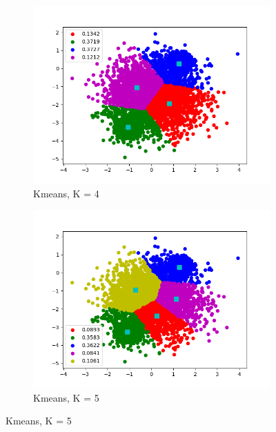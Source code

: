 \documentclass[12pt,letterpaper]{article}
\begin{document}
\begin{figure}
    \begin{subfigure}[b]{0.45\textwidth}
        \includegraphics[width=\textwidth]{imgs/kmeans_K_4.png}
        \caption{Kmeans, K = 4}
        \label{kmeans_4}
    \end{subfigure}
    \begin{subfigure}[b]{0.45\textwidth}
        \includegraphics[width=\textwidth]{imgs/kmeans_K_5.png}
        \caption{Kmeans, K = 5}
        \label{kmeans_5}
    \end{subfigure}
\end{figure}
\end{document}
